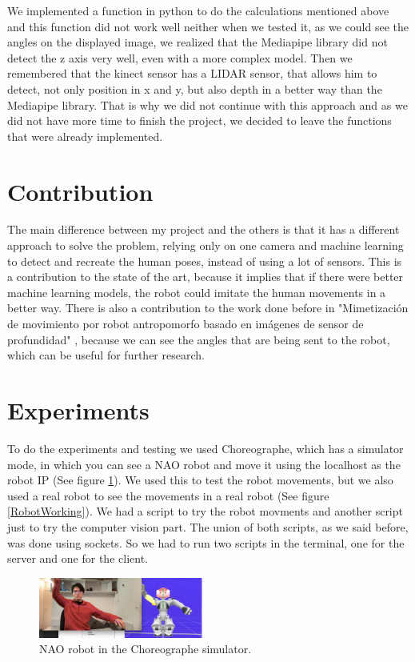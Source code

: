 \documentclass[conference]{IEEEtran}
\begin{document}
We implemented a function in python to do the calculations mentioned above and this function did not work well neither when we tested it, as we could see the angles on the displayed image, we realized that the Mediapipe library did not detect the z axis very well, even with a more complex model. Then we remembered that the kinect sensor has a LIDAR sensor, that allows him to detect, not only position in x and y, but also depth in a better way than the Mediapipe library. 
That is why we did not continue with this approach and as we did not have more time to finish the project, we decided to leave the functions that were already implemented.

\section{Contribution}
The main difference between my project and the others is that it has a different approach to solve the problem, relying only on one camera and machine learning to detect and recreate the human poses, instead of using a lot of sensors. This is a contribution to the state of the art, because it implies that if there were better machine learning models, the robot could imitate the human movements in a better way. 
There is also a contribution to the work done before in "Mimetización de movimiento por robot antropomorfo basado en imágenes de sensor de profundidad" \cite{b3}, because we can see the angles that are being sent to the robot, which can be useful for further research.


\section{Experiments}
To do the experiments and testing we used Choreographe, which has a simulator mode, in which you can see a NAO robot and move it using the localhost as the robot IP (See figure \ref{RobotSimulation}). We used this to test the robot movements, but we also used a real robot to see the movements in a real robot (See figure \ref{RobotWorking}).
We had a script to try the robot movments and another script just to try the computer vision part. The union of both scripts, as we said before, was done using sockets. So we had to run two scripts in the terminal, one for the server and one for the client.
\begin{figure}[htbp]
\centerline{\includegraphics[width=0.48\textwidth]{images/RobotSimulation.png}}
\caption{NAO robot in the Choreographe simulator.}
\label{RobotSimulation}
\end{figure}
\end{document}
